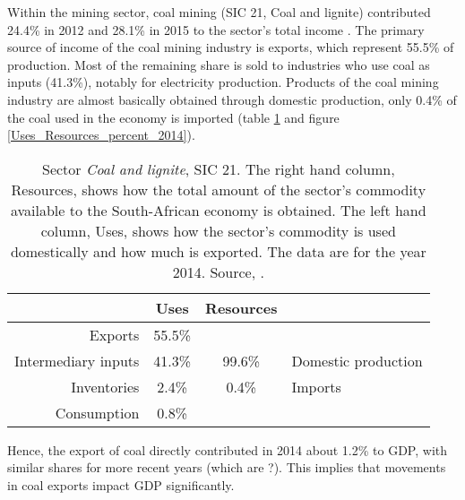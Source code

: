 \documentclass[12pt,english]{article}
\begin{document}
Within the mining sector, coal mining (SIC 21, Coal and lignite) contributed 24.4\% in 2012 and 28.1\% in 2015 to the sector's total income \citep{mining2015}. The primary source of income of the coal mining industry is exports, which represent 55.5\% of production. Most of the remaining share is sold to industries who use coal as inputs (41.3\%), notably for electricity production. Products of the coal mining industry are almost basically obtained through domestic production, only 0.4\% of the coal used in the economy is imported (table \ref{Mining2104_UR} and figure \ref{Uses_Resources_percent_2014}).

\begin{table}[!h]
	\centering
	\begin{tabular}{rc|cl}
		\hline
		& Uses & Resources  \\ 
		\hline
		Exports & 55.5\% & &\\ 
		Intermediary inputs &  41.3\%  & 99.6\% &  Domestic production\\ 
		Inventories &  2.4\% & 0.4\% & Imports    \\ 
		Consumption & 0.8\% &  &\\ 
		\hline
	\end{tabular}
	\caption{\label{Mining2104_UR}Sector \emph{Coal and lignite}, SIC 21. The right hand column, Resources, shows how the total amount of the sector's commodity available to the South-African economy is obtained. The left hand column, Uses, shows how the sector's commodity is used domestically and how much is exported. The data are for the year 2014. Source, \cite{IOT2014}.}
\end{table} 

Hence, the export of coal directly contributed in 2014 about 1.2\% to GDP, with similar shares for more recent years (which are ?). This implies that movements in coal exports impact GDP significantly. 
\end{document}
